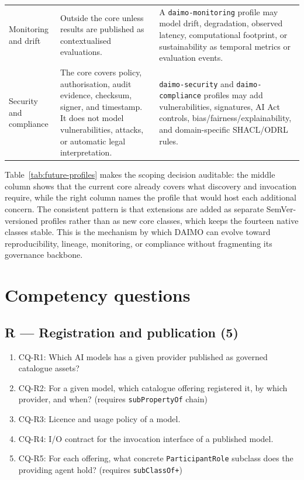 \documentclass[Afour,sagev,times]{sagej}
\newcommand{\code}[1]{\texttt{#1}}
\newcommand{\cq}[1]{\textsf{#1}}
\begin{document}
\begin{table}[tb]
\begin{tabular}{@{}p{3.2cm}p{5.9cm}p{6.0cm}@{}}
Monitoring and drift & Outside the core unless results are published as contextualised evaluations. & A \code{daimo-monitoring} profile may model drift, degradation, observed latency, computational footprint, or sustainability as temporal metrics or evaluation events. \\
Security and compliance & The core covers policy, authorisation, audit evidence, checksum, signer, and timestamp. It does not model vulnerabilities, attacks, or automatic legal interpretation. & \code{daimo-security} and \code{daimo-compliance} profiles may add vulnerabilities, signatures, AI Act controls, bias/fairness/explainability, and domain-specific SHACL/ODRL rules. \\
\bottomrule
\end{tabular}
\end{table}

Table~\ref{tab:future-profiles} makes the scoping decision auditable: the middle column shows that the current core already covers what discovery and invocation require, while the right column names the profile that would host each additional concern. The consistent pattern is that extensions are added as separate SemVer-versioned profiles rather than as new core classes, which keeps the fourteen native classes stable. This is the mechanism by which DAIMO can evolve toward reproducibility, lineage, monitoring, or compliance without fragmenting its governance backbone.

\section{Competency questions}\label{app:cqs}

\subsection*{R --- Registration and publication (5)}
\begin{enumerate}[label=\arabic*., leftmargin=*]
\item \cq{CQ-R1}: Which AI models has a given provider published as governed catalogue assets?
\item \cq{CQ-R2}: For a given model, which catalogue offering registered it, by which provider, and when? (requires \code{subPropertyOf} chain)
\item \cq{CQ-R3}: Licence and usage policy of a model.
\item \cq{CQ-R4}: I/O contract for the invocation interface of a published model.
\item \cq{CQ-R5}: For each offering, what concrete \code{ParticipantRole} subclass does the providing agent hold? (requires \code{subClassOf+})
\end{enumerate}
\end{document}
